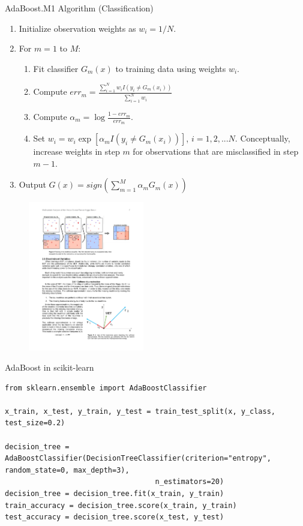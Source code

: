 \documentclass[aspectratio=169]{beamer}
\begin{document}
\begin{frame}{AdaBoost.M1 Algorithm (Classification)}
    \label{frame:adaboost}
    \begin{enumerate}
        \item Initialize observation weights as $w_i = 1/N$.
        \item For $m=1$ to $M$:
        \begin{enumerate}
            \item Fit classifier $G_m(x)$ to training data using weights $w_i$.
            \item Compute $err_m = \frac{\sum_{i=1}^{N} w_i I(y_i \neq G_m(x_i))}{\sum_{i=1}^{N} w_i}$
            \item Compute $\alpha_m = \log{\frac{1-err_m}{err_m}}$.
            \item Set $w_i = w_i\exp[\alpha_mI(y_i \neq G_m(x_i))]$, $i = 1, 2, ...N$. Conceptually, increase weights in step $m$ for observations that are misclassified in step $m-1$.
        \end{enumerate}
        \item Output $G(x) = sign\left( \sum_{m=1}^M \alpha_mG_m(x)\right)$
    \end{enumerate}
    \begin{figure}
        \centering
        \includegraphics[width=0.45\textwidth]{figures/adaboostalgo.pdf}
    \end{figure}
\end{frame}


\begin{frame}[fragile]{AdaBoost in scikit-learn}
\begin{verbatim}
from sklearn.ensemble import AdaBoostClassifier

x_train, x_test, y_train, y_test = train_test_split(x, y_class, test_size=0.2)

decision_tree = AdaBoostClassifier(DecisionTreeClassifier(criterion="entropy", random_state=0, max_depth=3), 
                                   n_estimators=20)
decision_tree = decision_tree.fit(x_train, y_train)
train_accuracy = decision_tree.score(x_train, y_train)
test_accuracy = decision_tree.score(x_test, y_test)
\end{verbatim}
\end{frame}
\end{document}
